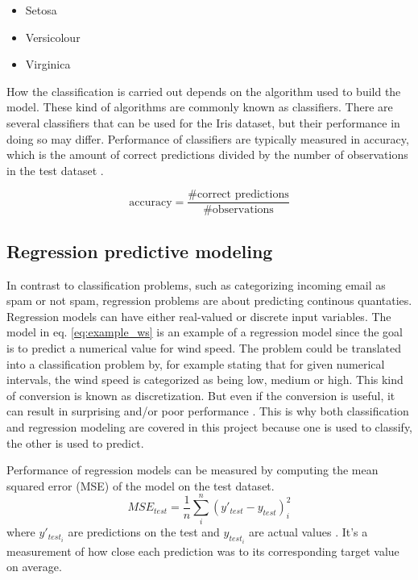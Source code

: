 \begin{itemize}
	\item Setosa
	\item Versicolour
	\item Virginica
\end{itemize}

	How the classification is carried out depends on the algorithm used to build the model. These kind of algorithms are commonly known as classifiers. There are several classifiers that can be used for the Iris dataset, but their performance in doing so may differ. Performance of classifiers are typically measured in accuracy, which is the amount of correct predictions divided by the number of observations in the test dataset \cite{BOOK:1}.

\begin{equation}
	\mbox{accuracy} = \frac{\mbox{\#correct predictions}}{\mbox{\#observations}}
\end{equation}
	
	\subsection{Regression predictive modeling} \label{sec:regression}
	In contrast to classification problems, such as categorizing incoming email as spam or not spam, regression problems are about predicting continous quantaties. Regression models can have either real-valued or discrete input variables. The model in eq. \ref{eq:example_ws} is an example of a regression model since the goal is to predict a numerical value for wind speed. The problem could be translated into a classification problem by, for example stating that for given numerical intervals, the wind speed is categorized as being low, medium or high. This kind of conversion is known as discretization. But even if the conversion is useful, it can result in surprising and/or poor performance \cite{WEBSITE:8}. This is why both classification and regression modeling are covered in this project because one is used to classify, the other is used to predict.

	Performance of regression models can be measured by computing the mean squared error (MSE) of the model on the test dataset. 
\begin{equation}
	MSE_{test} = \frac{1}{n} \sum_{i}^{n}(y'_{test} - y_{test})_{i}^2
\end{equation}
where $y'_{test_i}$ are predictions on the test and $y_{test_i}$ are actual values \cite{BOOK:1}. It's a measurement of how close each prediction was to its corresponding target value on average.

